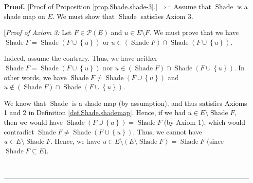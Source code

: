 \documentclass[numbers=enddot,12pt,final,onecolumn]{scrartcl}%
\theoremstyle{definition}
\newenvironment{proof}[1][Proof]{\noindent\textbf{#1.} }{\ \rule{0.5em}{0.5em}}
\newenvironment{verlong}{}{}
\begin{document}
\begin{verlong}
\begin{proof}
[Proof of Proposition \ref{prop.Shade.shade-3}.]$\Longrightarrow:$ Assume that
$\operatorname*{Shade}$ is a shade map on $E$. We must show that
$\operatorname*{Shade}$ satisfies Axiom 3.

[\textit{Proof of Axiom 3:} Let $F\in\mathcal{P}\left(  E\right)  $ and $u\in
E\setminus F$. We must prove that we have $\operatorname*{Shade}%
F=\operatorname*{Shade}\left(  F\cup\left\{  u\right\}  \right)  $ or
$u\in\left(  \operatorname*{Shade}F\right)  \cap\operatorname*{Shade}\left(
F\cup\left\{  u\right\}  \right)  $.

Indeed, assume the contrary. Thus, we have neither $\operatorname*{Shade}%
F=\operatorname*{Shade}\left(  F\cup\left\{  u\right\}  \right)  $ nor
$u\in\left(  \operatorname*{Shade}F\right)  \cap\operatorname*{Shade}\left(
F\cup\left\{  u\right\}  \right)  $. In other words, we have
$\operatorname*{Shade}F\neq\operatorname*{Shade}\left(  F\cup\left\{
u\right\}  \right)  $ and $u\notin\left(  \operatorname*{Shade}F\right)
\cap\operatorname*{Shade}\left(  F\cup\left\{  u\right\}  \right)  $.

We know that $\operatorname*{Shade}$ is a shade map (by assumption), and thus
satisfies Axioms 1 and 2 in Definition \ref{def.Shade.shademap}. Hence, if we
had $u\in E\setminus\operatorname*{Shade}F$, then we would have
$\operatorname*{Shade}\left(  F\cup\left\{  u\right\}  \right)
=\operatorname*{Shade}F$ (by Axiom 1), which would contradict
$\operatorname*{Shade}F\neq\operatorname*{Shade}\left(  F\cup\left\{
u\right\}  \right)  $. Thus, we cannot have $u\in E\setminus
\operatorname*{Shade}F$. Hence, we have $u\in E\setminus\left(  E\setminus
\operatorname*{Shade}F\right)  =\operatorname*{Shade}F$ (since
$\operatorname*{Shade}F\subseteq E$).


\end{proof}
\end{verlong}
\end{document}
